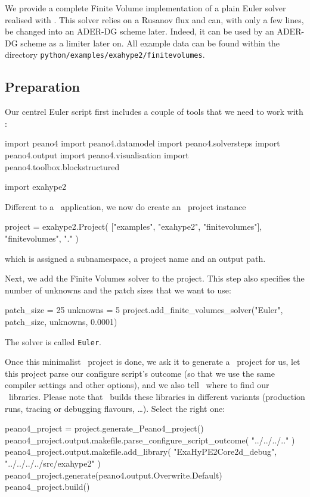 We provide a complete Finite Volume implementation of a plain Euler solver
realised with \ExaHyPE. 
This solver relies on a Rusanov flux and can, with only a few lines, be
changed into an ADER-DG scheme later.
Indeed, it can be used by an ADER-DG scheme as a limiter later on.
All example data can be found within the directory
\texttt{python/examples/exahype2/finitevolumes}.


\subsection{Preparation}

Our centrel Euler script first includes a couple of tools that we need to work
with \ExaHyPE:

\begin{code}
import peano4
import peano4.datamodel
import peano4.solversteps
import peano4.output
import peano4.visualisation
import peano4.toolbox.blockstructured

import exahype2
\end{code} 


\noindent
Different to a \Peano\ application, we now do create an \ExaHyPE\ project
instance
\begin{code}
project = exahype2.Project( ["examples", "exahype2", "finitevolumes"], "finitevolumes", "." )
\end{code}
\noindent
which is assigned a subnamespace, a project name and an output path.


Next, we add the Finite Volumes solver to the project. 
This step also specifies the number of unknowns and the patch sizes that we want
to use:
\begin{code}
patch_size = 25
unknowns   = 5
project.add_finite_volumes_solver("Euler", patch_size, unknowns, 0.0001)
\end{code}
\noindent
The solver is called \texttt{Euler}.


Once this minimalist \ExaHyPE\ project is done, we ask it to generate a \Peano\
project for us, let this project parse our configure script's outcome (so that
we use the same compiler settings and other options), and we also tell \Peano\
where to find our \ExaHyPE\ libraries.
Please note that \Peano\ builds these libraries in different variants
(production runs, tracing or debugging flavours, \ldots).
Select the right one:

\begin{code}
peano4_project = project.generate_Peano4_project()
peano4_project.output.makefile.parse_configure_script_outcome( "../../../.." )
peano4_project.output.makefile.add_library( "ExaHyPE2Core2d_debug", "../../../../src/exahype2" )
peano4_project.generate(peano4.output.Overwrite.Default)
peano4_project.build()
\end{code}


